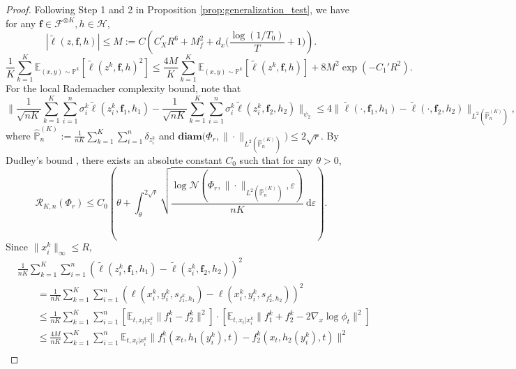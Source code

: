\documentclass{article}
\numberwithin{equation}{section}
\def\vf{{\bm{f}}}
\newcommand{\E}{\mathbb{E}}
\newcommand{\dif}{\mathrm{d}}
\theoremstyle{definition}
\renewcommand{\P}{\mathbb{P}}
\begin{document}
\begin{proof}
    Following Step 1 and 2 in Proposition \ref{prop:generalization_test}, we have for any $\vf\in\mathcal{F}^{\otimes K},h\in\mathcal{H}$,
    \begin{equation}
        |\widetilde{\ell}(z,\vf,h)|\leq M:=C\left(C_X^{''}R^6+M_f^2+d_x\Big(\frac{\log(1/T_0)}{T}+1\Big)\right).
    \end{equation}
    \begin{equation}
        \frac{1}{K}\sum_{k=1}^K\E_{(x,y)\sim\P^k} [\widetilde{\ell}(z^k,\vf,h)^2] \leq \frac{4M}{K}\sum_{k=1}^K\E_{(x,y)\sim\P^k} [\widetilde{\ell}(z^k,\vf,h)] + 8M^2\exp(-C_1'R^2).
    \end{equation}
    For the local Rademacher complexity bound, note that
    \begin{equation}
        \Big\|\frac{1}{\sqrt{nK}} \sum_{k=1}^K\sum_{i=1}^n\sigma_i^k\widetilde{\ell}(z_i^k,\vf_1,h_1) - \frac{1}{\sqrt{nK}} \sum_{k=1}^K\sum_{i=1}^n\sigma_i^k\widetilde{\ell}(z_i^k,\vf_2,h_2) \Big\|_{\psi_2} \leq 4\|\widetilde{\ell}(\cdot,\vf_1,h_1)-\widetilde{\ell}(\cdot,\vf_2,h_2)\|_{L^2(\widehat{\P}_n^{(K)})},
    \end{equation}
    where $\widehat{\P}_n^{(K)}:=\frac{1}{nK}\sum_{k=1}^K\sum_{i=1}^n\delta_{z_i^k}$ and $\textbf{diam}\big(\Phi_r,\|\cdot\|_{L^2(\widehat{\P}_n^{(K)})}\big)\leq 2\sqrt{r}$.
    By Dudley's bound \citep{van2014probability,wainwright2019high}, there exists an absolute constant $C_0$ such that for any $\theta>0$,
    \begin{equation}\label{eq:rademacher_bound_meta_2}
        \mathcal{R}_{K,n}(\Phi_r)\leq C_0\left(\theta+\int_\theta^{2\sqrt{r}}\sqrt{\frac{\log\mathcal{N}(\Phi_r,\|\cdot\|_{L^2(\widehat{\P}_n^{(K)})},\varepsilon)}{nK}}\ \dif\varepsilon\right).
    \end{equation}
    Since $\|x_i^k\|_\infty\leq R$,
    \begin{equation}
        \begin{aligned}
            &\frac{1}{nK}\sum_{k=1}^K\sum_{i=1}^n(\widetilde{\ell}(z_i^k,\vf_1,h_1)-\widetilde{\ell}(z_i^k,\vf_2,h_2))^2 \\
            &\qquad= \frac{1}{nK}\sum_{k=1}^K\sum_{i=1}^n(\ell(x_i^k,y_i^k,s_{f_1^k,h_1})-\ell(x_i^k,y_i^k,s_{f_2^k,h_2}))^2 \\
            &\qquad\leq \frac{1}{nK}\sum_{k=1}^K\sum_{i=1}^n \left[\E_{t,x_t|x_i^k}\|f_1^k-f_2^k\|^2\right]\cdot\left[\E_{t,x_t|x_i^k}\|f_1^k+f_2^k-2\nabla_x\log\phi_t\|^2\right] \\
            &\qquad\leq \frac{4M}{nK}\sum_{k=1}^K\sum_{i=1}^n \E_{t,x_t|x_i^k}\|f_1^k(x_t,h_1(y_i^k),t)-f_2^k(x_t,h_2(y_i^k),t)\|^2 \\

\end{aligned}
\end{equation}
\end{proof}
\end{document}
